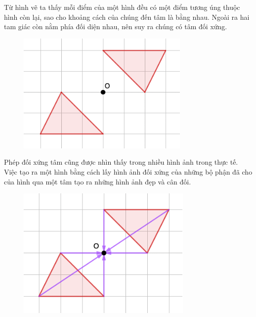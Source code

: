 \begin{multicols}{2}
\begin{figure}[H]
		\vspace*{-10pt}
	\end{figure}
	Từ hình vẽ ta thấy mỗi điểm của một hình đều có một điểm tương úng thuộc hình còn lại, sao cho khoảng cách của chúng đến tâm là bằng nhau. Ngoài ra hai tam giác còn nằm phía đối diện nhau, nên suy ra chúng có tâm đối xứng. 
	\begin{figure}[H]
		\vspace*{-5pt}
		\centering
		\captionsetup{labelformat= empty, justification=centering}
		\includegraphics[width= 1\linewidth]{Picture11}
		\vspace*{-10pt}
	\end{figure}
	Phép đối xứng tâm cũng được nhìn thấy trong nhiều hình ảnh trong thực tế. Việc tạo ra một hình bằng cách lấy hình ảnh đối xứng của những bộ phận đã cho của hình qua một tâm tạo ra những hình ảnh đẹp và cân đối.
	\begin{figure}[H]
		\vspace*{-5pt}
		\centering
		\captionsetup{labelformat= empty, justification=centering}
		\includegraphics[width= 1\linewidth]{Picture12}

\end{figure}
\end{multicols}
